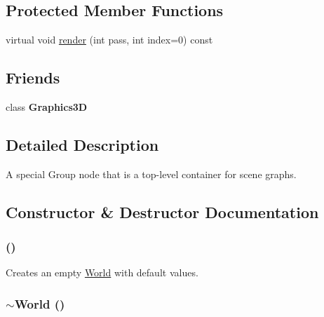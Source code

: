 \subsection*{Protected Member Functions}
\begin{CompactItemize}
\item 
virtual void \hyperlink{classm3g_1_1World_1efcb1973989d9963d5bd6d03065d389}{render} (int pass, int index=0) const 
\end{CompactItemize}
\subsection*{Friends}
\begin{CompactItemize}
\item 
\hypertarget{classm3g_1_1World_8174d4c629550c1ee279571250236ef4}{
class \textbf{Graphics3D}}
\label{classm3g_1_1World_8174d4c629550c1ee279571250236ef4}

\end{CompactItemize}


\subsection{Detailed Description}
A special Group node that is a top-level container for scene graphs. 

\subsection{Constructor \& Destructor Documentation}
\hypertarget{classm3g_1_1World_75e827b8787e735882f60c266d58e02e}{
\subsubsection[{World}]{ ()}}
\label{classm3g_1_1World_75e827b8787e735882f60c266d58e02e}


Creates an empty \hyperlink{classm3g_1_1World}{World} with default values. \hypertarget{classm3g_1_1World_bd170ded455f0b2273c1fe06da6ea0cb}{
\subsubsection[{$\sim$World}]{\setlength{\rightskip}{0pt plus 5cm}$\sim${\bf World} ()}}
\label{classm3g_1_1World_bd170ded455f0b2273c1fe06da6ea0cb}


